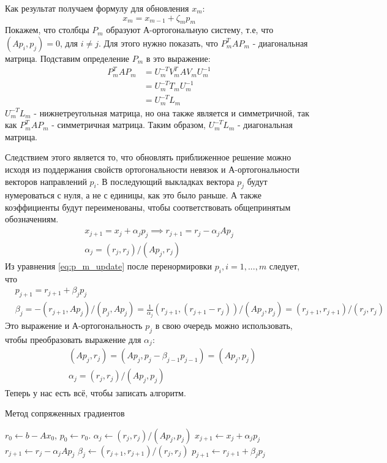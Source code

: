 Как результат получаем формулу для обновления $x_m$:
\begin{equation*}
    x_m = x_{m-1} + \zeta_m p_m
\end{equation*}
Покажем, что столбцы $P_m$ образуют А-ортогональную систему, т.е, что $(Ap_i,p_j) = 0$, для $i \neq j$.
Для этого нужно показать, что $P_m^T AP_m$ - диагональная матрица. Подставим определение $P_m$ в это выражение:
\begin{align}
    P_m^T AP_m &= U_m^{-T}V_m^T AV_m U_m^{-1} \\
               &= U_m^{-T}T_m U_m^{-1} \\
               &=U_m^{-T}L_m
\end{align}
$U_m^{-T}L_m$ - нижнетреугольная матрица, но она также является и симметричной, 
так как $P_m^T AP_m$ - симметричная матрица. Таким образом, $U_m^{-T}L_m$ - диагональная матрица.
\par Следствием этого является то, что обновлять приближенное решение можно исходя из
поддержания свойств ортогональности невязок и А-ортогональности векторов направлений $p_i$.
В последующий выкладках вектора $p_j$ будут нумероваться с нуля, а не с единицы, как это было раньше.
А также коэффициенты будут переименованы, чтобы соответствовать общепринятым обозначениям.
\begin{align*}
    x_{j+1} = x_j + \alpha_j p_j \implies r_{j+1} = r_j - \alpha_j A p_j \\
    \alpha_j = \left( r_j, r_j \right) / \left( Ap_j, r_j \right)
\end{align*}
Из уравнения \eqref{eq:p_m_update} после перенормировки $p_i, i=1,...,m$ следует, что 
\begin{align*}
    &p_{j+1} = r_{j+1} + \beta_j p_j  \\
    &\beta_j = - (r_{j+1}, Ap_j) / (p_j, Ap_j) = \frac{1}{\alpha_j} (r_{j+1}, (r_{j+1}-r_j)) / (Ap_j,p_j) = (r_{j+1}, r_{j+1}) / (r_j,r_j)
\end{align*}
Это выражение и А-ортогональность $p_j$ в свою очередь можно использовать, чтобы преобразовать выражение для $\alpha_j$:
\begin{align*}
    &(Ap_j,r_j) = (Ap_j,p_j-\beta_{j-1}p_{j-1}) = (Ap_j,p_j) \\
    &\alpha_j = (r_j,r_j)/(Ap_j, p_j)
\end{align*}
Теперь у нас есть всё, чтобы записать алгоритм.
\begin{algorithm}[H]
    \caption{Метод сопряженных градиентов}
    \begin{algorithmic}[1]
    \State $r_0 \gets b - A x_0$, $p_0 \gets r_0$.
        \State $\alpha_j \gets (r_j, r_j) / (A p_j, p_j)$
        \State $x_{j+1} \gets x_j + \alpha_j p_j$
        \State $r_{j+1} \gets r_j - \alpha_j A p_j$
        \State $\beta_j \gets (r_{j+1}, r_{j+1}) / (r_j, r_j)$
        \State $p_{j+1} \gets r_{j+1} + \beta_j p_j$
    \EndFor
    \end{algorithmic}
\end{algorithm}

